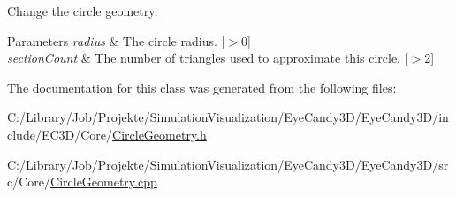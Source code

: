Change the circle geometry. 


\begin{DoxyParams}{Parameters}
{\em radius} & The circle radius. \mbox{[}$>$0\mbox{]} \\
\hline
{\em section\+Count} & The number of triangles used to approximate this circle. \mbox{[}$>$2\mbox{]} \\
\hline
\end{DoxyParams}


The documentation for this class was generated from the following files\+:\begin{DoxyCompactItemize}
\item 
C\+:/\+Library/\+Job/\+Projekte/\+Simulation\+Visualization/\+Eye\+Candy3\+D/\+Eye\+Candy3\+D/include/\+E\+C3\+D/\+Core/\mbox{\hyperlink{_circle_geometry_8h}{Circle\+Geometry.\+h}}\item 
C\+:/\+Library/\+Job/\+Projekte/\+Simulation\+Visualization/\+Eye\+Candy3\+D/\+Eye\+Candy3\+D/src/\+Core/\mbox{\hyperlink{_circle_geometry_8cpp}{Circle\+Geometry.\+cpp}}\end{DoxyCompactItemize}
